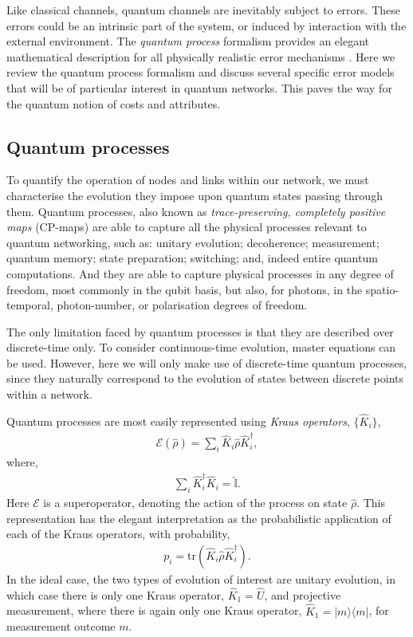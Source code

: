 \documentclass[aps,rmp,twocolumn,amsmath,amssymb,nofootinbib,superscriptaddress]{revtex4}
\newcommand{\bra}[1]{\langle#1|}
\newcommand{\ket}[1]{|#1\rangle}
\begin{document}
Like classical channels, quantum channels are inevitably subject to errors. These errors could be an intrinsic part of the system, or induced by interaction with the external environment. The \emph{quantum process} formalism provides an elegant mathematical description for all physically realistic error mechanisms \cite{bib:NielsenChuang00, bib:Gilchrist05}. Here we review the quantum process formalism and discuss several specific error models that will be of particular interest in quantum networks. This paves the way for the quantum notion of costs and attributes.

%
%

\subsection{Quantum processes}

To quantify the operation of nodes and links within our network, we must characterise the evolution they impose upon quantum states passing through them. Quantum processes, also known as \emph{trace-preserving, completely positive maps} (CP-maps) are able to capture all the physical processes relevant to quantum networking, such as: unitary evolution; decoherence; measurement; quantum memory; state preparation; switching; and, indeed entire quantum computations. And they are able to capture physical processes in any degree of freedom, most commonly in the qubit basis, but also, for photons, in the spatio-temporal, photon-number, or polarisation degrees of freedom.

The only limitation faced by quantum processes is that they are described over discrete-time only. To consider continuous-time evolution, master equations can be used. However, here we will only make use of discrete-time quantum processes, since they naturally correspond to the evolution of states between discrete points within a network.

Quantum processes are most easily represented using \emph{Kraus operators}, $\{\hat{K}_i\}$,
\begin{align}
\mathcal{E}(\hat\rho) = \sum_i \hat{K}_i \hat\rho \hat{K}_i^\dag,
\end{align}
where,
\begin{align}
\sum_i \hat{K}_i^\dag \hat{K}_i = \hat{\mathbb{I}}.
\end{align}
Here $\mathcal{E}$ is a superoperator, denoting the action of the process on state $\hat\rho$. This representation has the elegant interpretation as the probabilistic application of each of the Kraus operators, with probability,
\begin{align}
p_i = \mathrm{tr}(\hat{K}_i \hat\rho \hat{K}_i^\dag).
\end{align}
In the ideal case, the two types of evolution of interest are unitary evolution, in which case there is only one Kraus operator, \mbox{$\hat{K}_1=\hat{U}$}, and projective measurement, where there is again only one Kraus operator, \mbox{$\hat{K}_1=\ket{m}\bra{m}$}, for measurement outcome $m$.
\end{document}
